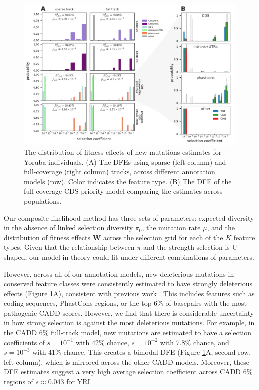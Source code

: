 \documentclass[11pt]{article}
\begin{document}
\begin{figure}[htbp] \centering
    \includegraphics[width=\textwidth]{figures/figure_3.pdf} 
    \caption{The distribution of fitness effects of new mutations estimates for
        Yoruba individuals. (A) The DFEs using sparse (left column) and
        full-coverage (right column) tracks, across different annotation models
        (row). Color indicates the feature type. (B) The DFE of the
        full-coverage CDS-priority model comparing the estimates across
    populations.}
  \label{fig:figure-3}
\end{figure}

Our composite likelihood method has three sets of parameters: expected
diversity in the absence of linked selection diversity $\pi_0$, the mutation
rate $\mu$, and the distribution of fitness effects $\mathbf{W}$ across the
selection grid for each of the $K$ feature types. Given that the relationship
between $\pi$ and the strength selection is U-shaped, our model in theory could
fit under different combinations of parameters.

However, across all of our annotation models, new deleterious mutations in
conserved feature classes were consistently estimated to have strongly
deleterious effects (Figure \ref{fig:figure-3}A), consistent with previous work
\parencite{McVicker2009-ax,Murphy2022-sj}. This includes features such as
coding sequences, PhastCons regions, or the top 6\% of basepairs with the most
pathogenic CADD scores. However, we find that there is considerable uncertainty
in how strong selection is against the most deleterious mutations. For example,
in the CADD 6\% full-track model, new mutations are estimated to have a
selection coefficients of $s = 10^{-1}$ with 42\% chance, $s=10^{-2}$ with
7.8\% chance, and $s=10^{-3}$ with 41\% chance. This creates a bimodal DFE
(Figure \ref{fig:figure-3}A, second row, left column), which is mirrored across
the other CADD models. Moreover, these DFE estimates suggest a very high
average selection coefficient across CADD 6\% regions of ${\bar{s}}
\approx 0.043$ for YRI.
\end{document}
